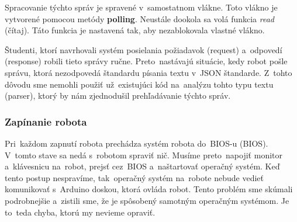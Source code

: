 	Spracovanie týchto správ je spravené v~samostatnom vlákne. Toto vlákno je vytvorené pomocou metódy \textbf{polling}.
	Neustále dookola sa volá funkcia \textit{read} (čítaj). Táto funkcia je nastavená tak, aby nezablokovala vlastné vlákno.

	Študenti, ktorí navrhovali systém posielania požiadavok (request) a~odpovedí (response) robili tieto správy
	ručne. Preto~nastávajú situácie, kedy robot pošle správu, ktorá nezodpovedá štandardu písania textu v~JSON
	štandarde. Z~tohto dôvodu sme nemohli použiť už~existujúci kód na~analýzu tohto typu textu (parser), ktorý
	by nám zjednodušil prehľadávanie týchto správ.

\subsubsection{Zapínanie robota}
\label{subsec:zapinanieRobota}

	Pri~každom zapnutí robota prechádza systém robota do~BIOS-u (\acrlong{BIOS}). V~tomto stave sa nedá s~robotom spraviť
	nič. Musíme preto~napojiť monitor a~klávesnicu na~robot, prejsť cez~BIOS a~naštartovať operačný systém. Keď tento
	postup nespravíme, tak~operačný systém na~robote nebude vedieť komunikovať s~Arduino doskou, ktorá ovláda robot.
	Tento problém sme skúmali podrobnejšie a~zistili sme, že je spôsobený samotným operačným systémom. Je to~teda
	chyba, ktorú my nevieme opraviť.

